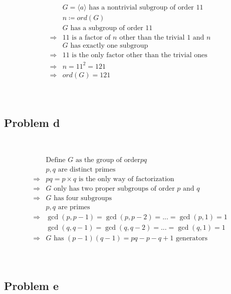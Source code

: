 \documentclass{article}
\begin{document}
\begin{equation*}
    \begin{split}
        &G=\langle a\rangle\text{ has a nontrivial subgroup of order }11\\
        &n\coloneqq ord(G)\\
        &G\text{ has a subgroup of order }11\\
        \Rightarrow&11\text{ is a factor of }n\text{ other than the trivial }1\text{ and }n\\
        &G\text{ has exactly one subgroup}\\
        \Rightarrow&11\text{ is the only factor other than the trivial ones}\\
        \Rightarrow&n=11^2=121\\
        \Rightarrow&ord(G)=121\\
    \end{split}
\end{equation*}

~

\subsection*{Problem d}

~

\begin{equation*}
    \begin{split}
        &\text{Define } G\text{ as the group of order}pq\\
        &p,q\text{ are distinct primes}\\
        \Rightarrow&pq=p\times q\text{ is the only way of factorization}\\
        \Rightarrow&G\text{ only has two proper subgroups of order }p\text{ and }q\\
        \Rightarrow&G\text{ has four subgroups}\\
        &p,q\text{ are primes}\\
        \Rightarrow&\gcd(p,p-1)=\gcd(p,p-2)=...=\gcd(p,1)=1\\
        &\gcd(q,q-1)=\gcd(q,q-2)=...=\gcd(q,1)=1\\
        \Rightarrow&G\text{ has }(p-1)(q-1)=pq-p-q+1\text{ generators}\\
    \end{split}
\end{equation*}

~

\subsection*{Problem e}
\end{document}
